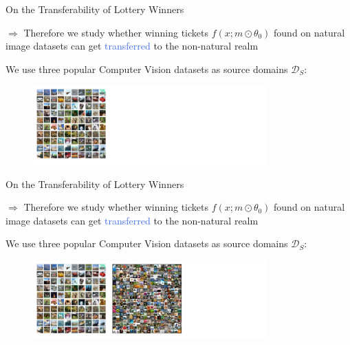 \documentclass{beamer}
\begin{document}
\begin{frame}{On the Transferability of Lottery Winners}

	$\Rightarrow$ Therefore we study whether winning tickets $f(x;m \odot \theta_0)$
	found on natural image datasets can get \textcolor{RoyalBlue}{transferred} to the non-natural realm

	\bigskip

	We use three popular Computer Vision datasets as source domains $\mathcal{D}_S$:

	\begin{figure}
 \includegraphics[width=0.8\textwidth]{figures/cifar10}
\end{figure}
\end{frame}

\begin{frame}{On the Transferability of Lottery Winners}

	$\Rightarrow$ Therefore we study whether winning tickets $f(x;m \odot \theta_0)$
	found on natural image datasets can get \textcolor{RoyalBlue}{transferred} to the non-natural realm

	\bigskip

	We use three popular Computer Vision datasets as source domains $\mathcal{D}_S$:

	\begin{figure}
 \includegraphics[width=0.8\textwidth]{figures/cifar100}
\end{figure}
\end{frame}
\end{document}
